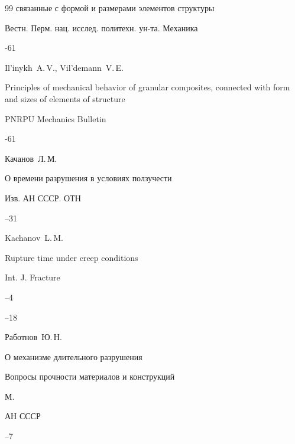 \begin{thebibliography}{99}
связанные с формой и размерами элементов структуры

\jour Вестн. Перм. нац. исслед. политехн. ун-та. Механика



-61

\misctransl 

\by  Il'inykh~A.\,V., Vil'demann~V.\,E.

\paper Principles of mechanical behavior of granular composites, connected with form and sizes of elements of structure

\jour PNRPU Mechanics Bulletin



-61



\pagebreak






\by Качанов~Л.\,М.

\paper О времени разрушения в условиях ползучести

\jour Изв. АН СССР. ОТН



--31

\transl

\by Kachanov~L.\,M.

\paper Rupture time under creep conditions

\jour Int. J. Fracture 



--4

--18





\by Работнов~Ю.\,Н.

\paper О механизме длительного разрушения

\inbook Вопросы прочности материалов и конструкций

\publaddr М.

\publ АН СССР


--7

\misctransl


\end{thebibliography}
